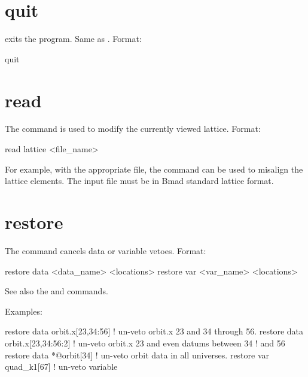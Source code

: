 \section{quit}
\label{s:quit}

 exits the program. Same as .
Format:
\begin{example}
  quit
\end{example}

\section{read}
\label{s:read}

The  command is used to modify the currently
viewed  lattice. Format:
\begin{example}
  read lattice <file_name>
\end{example}

\vskip 0.2in 
For example, with the appropriate file,
the  command can be used to misalign the lattice
elements. The input file must be in Bmad standard lattice format.

\section{restore}
\label{s:restore}

The  command cancels data or variable
vetoes. Format:
\begin{example}
  restore data  <data_name> <locations>
  restore var <var_name> <locations>
\end{example}

\vskip 0.2in 
See also the 
and  commands.

Examples:
\begin{example}
  restore data orbit.x[23,34:56]   ! un-veto orbit.x 23 and 34 through 56.
  restore data orbit.x[23,34:56:2] ! un-veto orbit.x 23 and even datums between 34 
                                   !                                          and 56
  restore data *@orbit[34]         ! un-veto orbit data in all universes.
  restore var quad_k1[67]          ! un-veto variable
\end{example}


